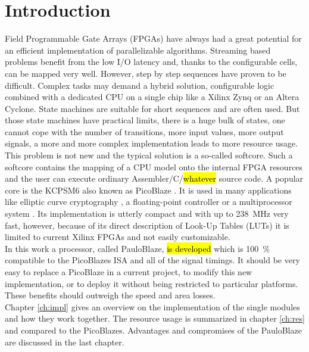 \chapter{Introduction}

Field Programmable Gate Arrays (FPGAs) have always had a great potential for an efficient implementation of parallelizable algorithms.
Streaming based problems benefit from the low I/O latency and, thanks to the configurable cells, can be mapped very well.
However, step by step sequences have proven to be difficult. 
Complex tasks may demand a hybrid solution, configurable logic combined with a dedicated CPU on a single chip like a Xilinx Zynq or an Altera Cyclone.
State machines are suitable for short sequences and are often used.
But those state machines have practical limits, there is a huge bulk of states, one cannot cope with the number of transitions, more input values, more output signals, a more and more complex implementation leads to more resource usage.
This problem is not new and the typical solution is a so-called softcore.
Such a softcore contains the mapping of a CPU model onto the internal FPGA resources and the user can execute ordinary Assembler/C/\hl{whatever} source code.
A popular core is the KCPSM6 also known as PicoBlaze \cite{PicoBlaze}. It is used in many applications like elliptic curve cryptography \cite{ref_elliptic}, a floating-point controller \cite{kadlec2005floating} or a multiprocessor system \cite{ref_paral_exec}.
Its implementation is utterly compact and with up to \SI{238}{\mega\hertz} very fast, however, because of its direct description of Look-Up Tables (LUTs) it is limited to current Xilinx FPGAs and not easily customizable.
\\ 
In this work a processor, called PauloBlaze, \hl{is developed} which is \SI{100}{\percent} compatible to the PicoBlazes ISA and all of the signal timings.
It should be very easy to replace a PicoBlaze in a current project, to modify this new implementation, or to deploy it without being restricted to particular platforms.
These benefits should outweigh the speed and area losses.
\\
Chapter \ref{ch:impl} gives an overview on the implementation of the single modules and how they work together.
The resource usage is summarized in chapter \ref{ch:res} and compared to the PicoBlazes.
Advantages and compromises of the PauloBlaze are discussed in the last chapter.
